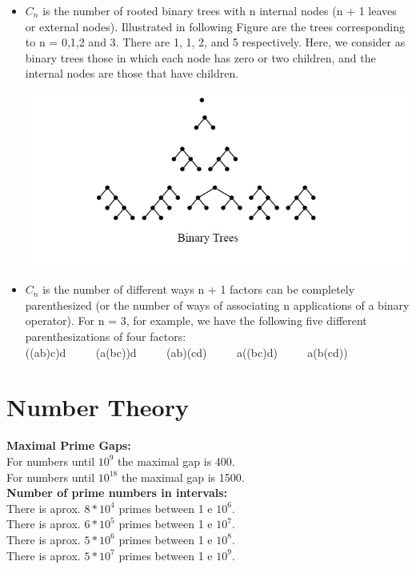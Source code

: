 \documentclass[10pt, twocolumn]{article}
\begin{document}
\begin{flushleft}
\begin{itemize}
\item $C_n$ is the number of rooted binary trees with n internal nodes (n + 1 leaves or external nodes). Illustrated in following Figure are the trees corresponding to n = 0,1,2 and 3. There are 1, 1, 2, and 5 respectively. Here, we consider as binary trees those in which each node has zero or two children, and the internal nodes are those that have children.
\begin{center}
\includegraphics[scale=0.6]{Binary_Trees.png}
\end{center}


\item $C_n$ is the number of different ways n + 1 factors can be completely parenthesized (or the number of ways of associating n applications of a binary operator). For n = 3, for example, we have the following five different parenthesizations of four factors:\\
((ab)c)d  $\qquad$  (a(bc))d  $\qquad$  (ab)(cd)  $\qquad$  a((bc)d)  $\qquad$  a(b(cd))

\end{itemize}


\section{Number Theory}

\textbf{Maximal Prime Gaps:}\\
For numbers until $10^9$ the maximal gap is 400.\\
For numbers until $10^{18}$ the maximal gap is 1500.\\[0.5cm]

\textbf{Number of prime numbers in intervals:}\\
There is aprox. $8*10^4$ primes between 1 e $10^6$.\\
There is aprox. $6*10^5$ primes between 1 e $10^7$.\\
There is aprox. $5*10^6$ primes between 1 e $10^8$.\\
There is aprox. $5*10^7$ primes between 1 e $10^9$.\\[0.5cm]




\end{flushleft}
\end{document}
